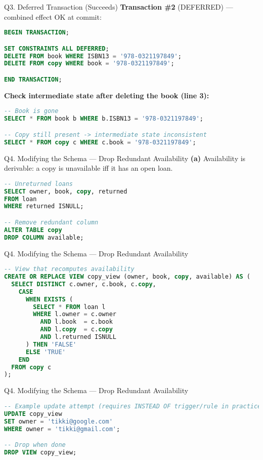 \documentclass{beamer}
\begin{document}
\begin{frame}[fragile]{Q3. Deferred Transaction (Succeeds)}
\textbf{Transaction \#2} (DEFERRED) — combined effect OK at commit:
\begin{lstlisting}[language=SQL]
BEGIN TRANSACTION;

SET CONSTRAINTS ALL DEFERRED;
DELETE FROM book WHERE ISBN13 = '978-0321197849';
DELETE FROM copy WHERE book = '978-0321197849';

END TRANSACTION;
\end{lstlisting}

\textbf{Check intermediate state after deleting the book (line 3):}
\begin{lstlisting}[language=SQL]
-- Book is gone
SELECT * FROM book b WHERE b.ISBN13 = '978-0321197849';

-- Copy still present -> intermediate state inconsistent
SELECT * FROM copy c WHERE c.book = '978-0321197849';
\end{lstlisting}
\end{frame}

\begin{frame}[fragile]{Q4. Modifying the Schema — Drop Redundant Availability}
\textbf{(a)} Availability is derivable: a copy is unavailable iff it has an open loan.
\begin{lstlisting}[language=SQL]
-- Unreturned loans
SELECT owner, book, copy, returned
FROM loan
WHERE returned ISNULL;

-- Remove redundant column
ALTER TABLE copy
DROP COLUMN available;
\end{lstlisting}
\end{frame}

\begin{frame}[fragile]{Q4. Modifying the Schema — Drop Redundant Availability}
\begin{lstlisting}[language=SQL]
-- View that recomputes availability
CREATE OR REPLACE VIEW copy_view (owner, book, copy, available) AS (
  SELECT DISTINCT c.owner, c.book, c.copy,
    CASE
      WHEN EXISTS (
        SELECT * FROM loan l
        WHERE l.owner = c.owner
          AND l.book  = c.book
          AND l.copy  = c.copy
          AND l.returned ISNULL
      ) THEN 'FALSE'
      ELSE 'TRUE'
    END
  FROM copy c
);
\end{lstlisting}
\end{frame}
\begin{frame}[fragile]{Q4. Modifying the Schema — Drop Redundant Availability}
\begin{lstlisting}[language=SQL]
-- Example update attempt (requires INSTEAD OF trigger/rule in practice)
UPDATE copy_view
SET owner = 'tikki@google.com'
WHERE owner = 'tikki@gmail.com';

-- Drop when done
DROP VIEW copy_view;
\end{lstlisting}
\end{frame}
\end{document}
